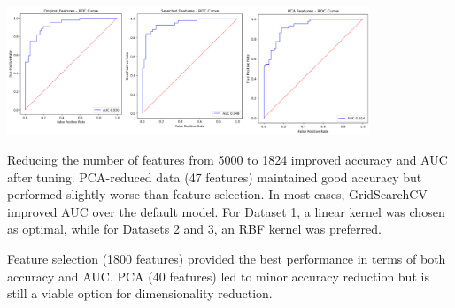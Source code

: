 \documentclass[
  12pt,
  letterpaper,
  DIV=11,
  numbers=noendperiod]{scrartcl}
\begin{document}
\includegraphics[width=4.27in,height=\textheight]{me_files/figure-pdf/unnamed-chunk-31-1.png}

Reducing the number of features from 5000 to 1824 improved accuracy and
AUC after tuning. PCA-reduced data (47 features) maintained good
accuracy but performed slightly worse than feature selection. In most
cases, GridSearchCV improved AUC over the default model. For Dataset 1,
a linear kernel was chosen as optimal, while for Datasets 2 and 3, an
RBF kernel was preferred.~ ~

Feature selection (1800 features) provided the best performance in terms
of both accuracy and AUC. PCA (40 features) led to minor accuracy
reduction but is still a viable option for dimensionality reduction.
\end{document}
